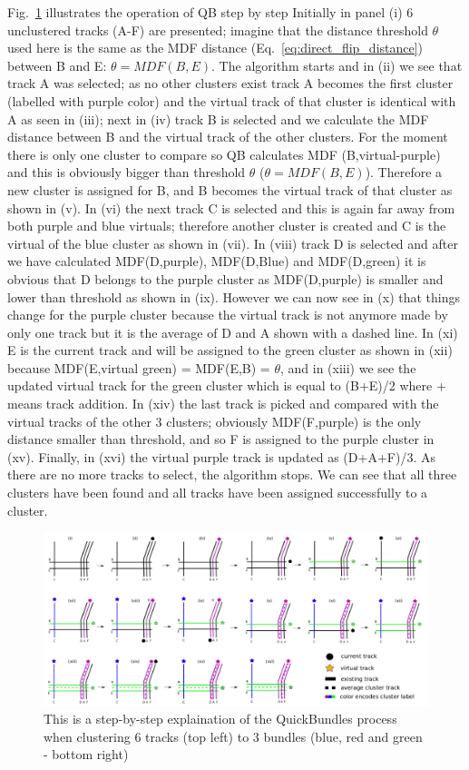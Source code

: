 \documentclass[journal]{IEEEtran}
\begin{document}
Fig.~\ref{Fig:LSC_simple} illustrates the operation of QB step by step
Initially in panel (i) 6 unclustered tracks (A-F) are presented; imagine
that the distance threshold $\theta$ used here is the same as the MDF
distance (Eq.~\ref{eq:direct_flip_distance}) between B and E: $\theta =
MDF(B,E)$. The algorithm starts and in (ii) we see that track A was
selected; as no other clusters exist track A becomes the first cluster
(labelled with purple color) and the virtual track of that cluster is
identical with A as seen in (iii); next in (iv) track B is selected and
we calculate the MDF distance between B and the virtual track of the
other clusters. For the moment there is only one cluster to compare so
QB calculates MDF (B,virtual-purple) and this is obviously bigger than
threshold $\theta$ ($\theta = MDF(B,E)$).  Therefore a new cluster is
assigned for B, and B becomes the virtual track of that cluster as shown
in (v). In (vi) the next track C is selected and this is again far away
from both purple and blue virtuals; therefore another cluster is created
and C is the virtual of the blue cluster as shown in (vii).  In (viii)
track D is selected and after we have calculated MDF(D,purple),
MDF(D,Blue) and MDF(D,green) it is obvious that D belongs to the purple
cluster as MDF(D,purple) is smaller and lower than threshold as shown in
(ix).  However we can now see in (x) that things change for the purple
cluster because the virtual track is not anymore made by only one track
but it is the average of D and A shown with a dashed line. In (xi) E is
the current track and will be assigned to the green cluster as shown in
(xii) because MDF(E,virtual green) = MDF(E,B) = $\theta$, and in (xiii)
we see the updated virtual track for the green cluster which is equal to
(B+E)/2 where + means track addition. In (xiv) the last track is picked
and compared with the virtual tracks of the other 3 clusters; obviously
MDF(F,purple) is the only distance smaller than threshold, and so F is
assigned to the purple cluster in (xv).  Finally, in (xvi) the virtual
purple track is updated as (D+A+F)/3. As there are no more tracks to
select, the algorithm stops. We can see that all three clusters have
been found and all tracks have been assigned successfully to a cluster.

\begin{figure}[hb]
\centering\includegraphics[scale=0.25]{Fig_1_QB_algorithm}
\caption{This is a step-by-step explaination of the QuickBundles process when clustering 6 tracks (top left) to 3 bundles (blue, red and green - bottom right)}
\label{Fig:LSC_simple}
\end{figure}

\end{document}
